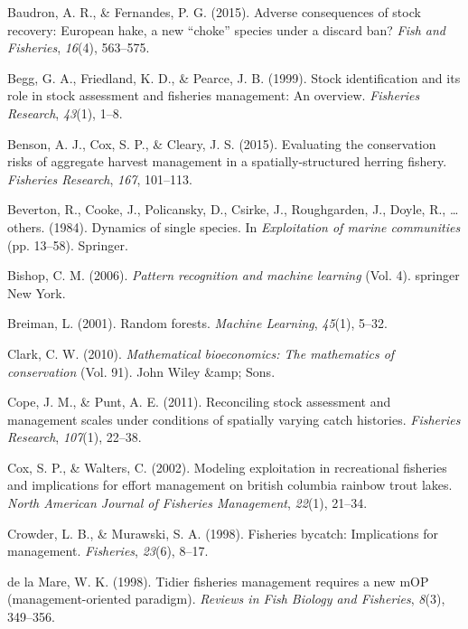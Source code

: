 \documentclass[12pt,]{scrartcl}
\begin{document}
\hypertarget{refs}{}
\hypertarget{ref-baudron2015adverse}{}
Baudron, A. R., \& Fernandes, P. G. (2015). Adverse consequences of
stock recovery: European hake, a new ``choke'' species under a discard
ban? \emph{Fish and Fisheries}, \emph{16}(4), 563--575.

\hypertarget{ref-begg1999stock}{}
Begg, G. A., Friedland, K. D., \& Pearce, J. B. (1999). Stock
identification and its role in stock assessment and fisheries
management: An overview. \emph{Fisheries Research}, \emph{43}(1), 1--8.

\hypertarget{ref-benson2015evaluating}{}
Benson, A. J., Cox, S. P., \& Cleary, J. S. (2015). Evaluating the
conservation risks of aggregate harvest management in a
spatially-structured herring fishery. \emph{Fisheries Research},
\emph{167}, 101--113.

\hypertarget{ref-beverton1984dynamics}{}
Beverton, R., Cooke, J., Policansky, D., Csirke, J., Roughgarden, J.,
Doyle, R., \ldots{} others. (1984). Dynamics of single species. In
\emph{Exploitation of marine communities} (pp. 13--58). Springer.

\hypertarget{ref-bishop2006pattern}{}
Bishop, C. M. (2006). \emph{Pattern recognition and machine learning}
(Vol. 4). springer New York.

\hypertarget{ref-breiman2001random}{}
Breiman, L. (2001). Random forests. \emph{Machine Learning},
\emph{45}(1), 5--32.

\hypertarget{ref-clark2010mathematical}{}
Clark, C. W. (2010). \emph{Mathematical bioeconomics: The mathematics of
conservation} (Vol. 91). John Wiley \&amp; Sons.

\hypertarget{ref-cope2011reconciling}{}
Cope, J. M., \& Punt, A. E. (2011). Reconciling stock assessment and
management scales under conditions of spatially varying catch histories.
\emph{Fisheries Research}, \emph{107}(1), 22--38.

\hypertarget{ref-cox2002modeling}{}
Cox, S. P., \& Walters, C. (2002). Modeling exploitation in recreational
fisheries and implications for effort management on british columbia
rainbow trout lakes. \emph{North American Journal of Fisheries
Management}, \emph{22}(1), 21--34.

\hypertarget{ref-crowder1998fisheries}{}
Crowder, L. B., \& Murawski, S. A. (1998). Fisheries bycatch:
Implications for management. \emph{Fisheries}, \emph{23}(6), 8--17.

\hypertarget{ref-de-la-Mare1998Tidier-fisherie}{}
de la Mare, W. K. (1998). Tidier fisheries management requires a new mOP
(management-oriented paradigm). \emph{Reviews in Fish Biology and
Fisheries}, \emph{8}(3), 349--356.
\end{document}

